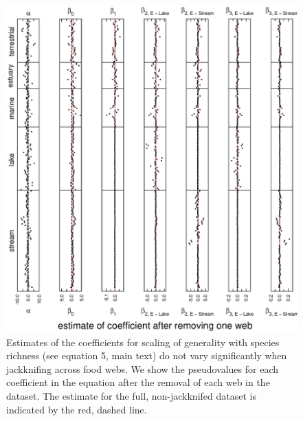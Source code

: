 \documentclass[12pt]{article}
\begin{document}
    \begin{figure}[!h]
    \centerline{\includegraphics*[height=.75\textheight]{Figures/Jackknife/Gen_web.eps}}
    \caption{Estimates of the coefficients for scaling of generality with species richness
    (see equation 5, main text) do not vary significantly
    when jackknifing across food webs. We show the pseudovalues for each coefficient
    in the equation after the removal of each web in the dataset. The estimate for the full, non-jackknifed
    dataset is indicated by the red, dashed line. }
    \label{Gen_web}
    \end{figure}

  \newpage
\end{document}
